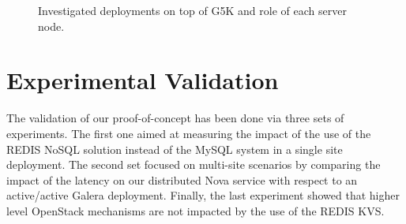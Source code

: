\begin{figure}[btp]
\subcapcentertrue
{}
\caption{Investigated deployments on top of G5K and role of each server node.}
\label{fig:exp-deployment}
\end{figure}


\section{Experimental Validation\label{sec:eval}}

The validation of our proof-of-concept has been done via three sets of
experiments. The first one aimed at measuring the impact of the use of the REDIS
NoSQL solution instead of the MySQL system in a single site deployment. The
second set focused on multi-site scenarios by comparing the impact of the
latency on our distributed Nova service with respect to an active/active Galera
deployment. Finally, the last experiment showed that higher level OpenStack mechanisms
are not impacted by the use of the REDIS KVS.

